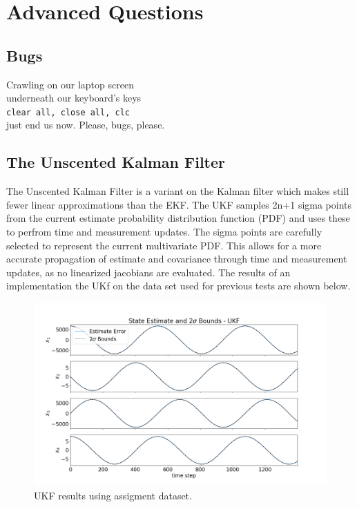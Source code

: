 \documentclass[11pt, a4paper]{article}
\begin{document}
\newpage

\section*{Advanced Questions}
\subsection{Bugs}
Crawling on our laptop screen \\
underneath our keyboard's keys \\
\texttt{clear all, close all, clc} \\
just end us now. Please, bugs, please. \\
 
\subsection{The Unscented Kalman Filter}
The Unscented Kalman Filter is a variant on the Kalman filter which makes still fewer linear approximations than the EKF. 
The UKF samples 2n+1 sigma points from the current estimate probability distribution function (PDF) and uses these to perfrom time and measurement updates.
The sigma points are carefully selected to represent the current multivariate PDF. 
This allows for a more accurate propagation of estimate and covariance through time and measurement updates, as no linearized jacobians are evaluated. 
The results of an implementation the UKf on the data set used for previous tests are shown below.

\begin{figure}[H]
	\centering
	\includegraphics[width=\textwidth]{Figures/ukf_dataset_est.png}
	\caption{UKF results using assigment dataset.}
	\label{fig:ukf_dataset}
\end{figure}
\end{document}
